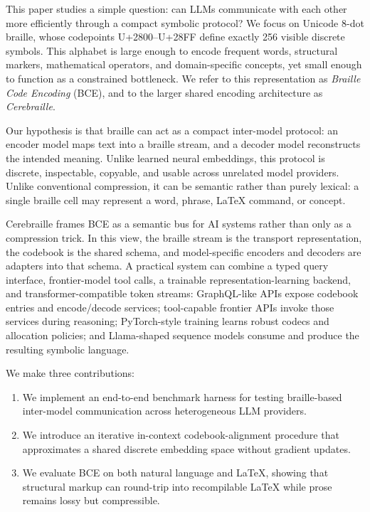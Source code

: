 \documentclass[11pt]{article}
\begin{document}
This paper studies a simple question: can LLMs communicate with each other more efficiently through a compact symbolic protocol? We focus on Unicode 8-dot braille, whose codepoints U+2800--U+28FF define exactly 256 visible discrete symbols. This alphabet is large enough to encode frequent words, structural markers, mathematical operators, and domain-specific concepts, yet small enough to function as a constrained bottleneck. We refer to this representation as \emph{Braille Code Encoding} (BCE), and to the larger shared encoding architecture as \emph{Cerebraille}.

Our hypothesis is that braille can act as a compact inter-model protocol: an encoder model maps text into a braille stream, and a decoder model reconstructs the intended meaning. Unlike learned neural embeddings, this protocol is discrete, inspectable, copyable, and usable across unrelated model providers. Unlike conventional compression, it can be semantic rather than purely lexical: a single braille cell may represent a word, phrase, LaTeX command, or concept.

Cerebraille frames BCE as a semantic bus for AI systems rather than only as a compression trick. In this view, the braille stream is the transport representation, the codebook is the shared schema, and model-specific encoders and decoders are adapters into that schema. A practical system can combine a typed query interface, frontier-model tool calls, a trainable representation-learning backend, and transformer-compatible token streams: GraphQL-like APIs expose codebook entries and encode/decode services; tool-capable frontier APIs invoke those services during reasoning; PyTorch-style training learns robust codecs and allocation policies; and Llama-shaped sequence models consume and produce the resulting symbolic language.

We make three contributions:
\begin{enumerate}[leftmargin=*]
  \item We implement an end-to-end benchmark harness for testing braille-based inter-model communication across heterogeneous LLM providers.
  \item We introduce an iterative in-context codebook-alignment procedure that approximates a shared discrete embedding space without gradient updates.
  \item We evaluate BCE on both natural language and LaTeX, showing that structural markup can round-trip into recompilable LaTeX while prose remains lossy but compressible.
\end{enumerate}
\end{document}
